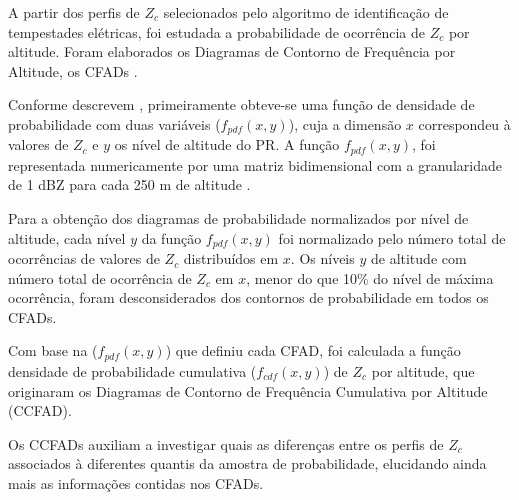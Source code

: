 A partir dos perfis de $Z_c$ selecionados pelo algoritmo de identificação de tempestades elétricas, foi estudada a probabilidade de ocorrência de $Z_c$ por altitude. Foram elaborados os Diagramas de Contorno de Frequência por Altitude, os CFADs \cite{yuter1995}.

Conforme descrevem , primeiramente obteve-se uma função de densidade de probabilidade com duas variáveis ($f_{pdf}(x,y)$), cuja a dimensão $x$ correspondeu à valores de $Z_{c}$ e $y$ os nível de altitude do PR. A função $f_{pdf}(x,y)$, foi representada numericamente por uma matriz bidimensional com a granularidade de 1 dBZ para cada 250 m de altitude \cite{yuter1995}.



Para a obtenção dos diagramas de probabilidade normalizados por nível de altitude, cada nível $y$ da função $f_{pdf}(x,y)$ foi normalizado pelo número total de ocorrências de valores de $Z_c$ distribuídos em $x$. Os níveis $y$ de altitude com número total de ocorrência de $Z_c$ em $x$, menor do que 10\% do nível de máxima ocorrência, foram desconsiderados dos contornos de probabilidade em todos os CFADs.

Com base na ($f_{pdf}(x,y)$) que definiu cada CFAD, foi calculada a função densidade de probabilidade cumulativa ($f_{cdf}(x,y)$) de $Z_c$ por altitude, que originaram os Diagramas de Contorno de Frequência Cumulativa por Altitude (CCFAD).     



Os CCFADs auxiliam a investigar quais as diferenças entre os perfis de $Z_c$ associados à diferentes quantis da amostra de probabilidade, elucidando ainda mais as informações contidas nos CFADs.





